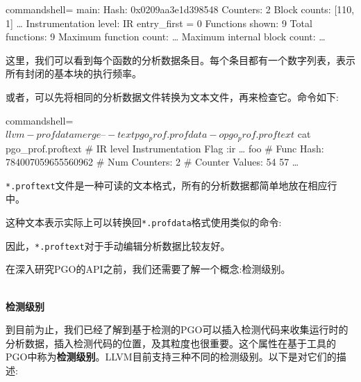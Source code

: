 \begin{tcblisting}{commandshell={}}
  main:
    Hash: 0x0209aa3e1d398548
    Counters: 2
    Block counts: [110, 1]
…
Instrumentation level: IR entry_first = 0
Functions shown: 9
Total functions: 9
Maximum function count: …
Maximum internal block count: …
\end{tcblisting}

这里，我们可以看到每个函数的分析数据条目。每个条目都有一个数字列表，表示所有封闭的基本块的执行频率。

或者，可以先将相同的分析数据文件转换为文本文件，再来检查它。命令如下:

\begin{tcblisting}{commandshell={}}
$ llvm-profdata merge –-text pgo_prof.profdata -o pgo_prof.
proftext
$ cat pgo_prof.proftext
# IR level Instrumentation Flag
:ir
…
foo
# Func Hash:
784007059655560962
# Num Counters:
2
# Counter Values:
54
57
…
\end{tcblisting}

\texttt{*.proftext}文件是一种可读的文本格式，所有的分析数据都简单地放在相应行中。

这种文本表示实际上可以转换回\texttt{*.profdata}格式使用类似的命令:


因此，\texttt{*.proftext}对于手动编辑分析数据比较友好。

在深入研究PGO的API之前，我们还需要了解一个概念:检测级别。

\hspace*{\fill} \\ %
\noindent
\textbf{检测级别}

到目前为止，我们已经了解到基于检测的PGO可以插入检测代码来收集运行时的分析数据，插入检测代码的位置，及其粒度也很重要。这个属性在基于工具的PGO中称为\textbf{检测级别}。LLVM目前支持三种不同的检测级别。以下是对它们的描述:

